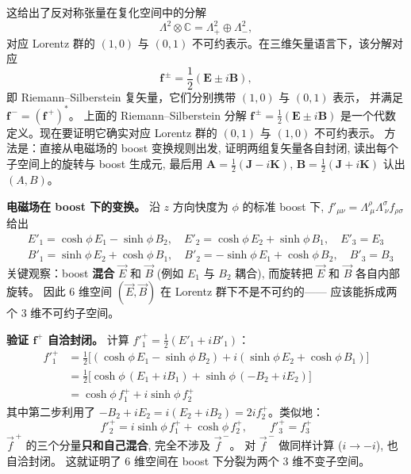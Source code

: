 这给出了反对称张量在复化空间中的分解
\[
\boxed{\Lambda^2 \otimes \mathbb{C} = \Lambda^2_+ \oplus \Lambda^2_-,}
\]
对应 Lorentz 群的 $(1,0)$ 与 $(0,1)$ 不可约表示。在三维矢量语言下，该分解对应
\begin{equation}
\boldsymbol{f}^{\,\pm} = \frac{1}{2}(\boldsymbol{E} \pm i\boldsymbol{B}),
\end{equation}
即 Riemann--Silberstein 复矢量，它们分别携带 $(1,0)$ 与 $(0,1)$ 表示，
并满足 $\boldsymbol{f}^{\,-} = (\boldsymbol{f}^{\,+})^*$。
上面的 Riemann--Silberstein 分解 $\boldsymbol{f}^{\,\pm}=\frac{1}{2}(\boldsymbol{E}\pm i\boldsymbol{B})$
是一个代数定义。现在要证明它确实对应 Lorentz 群的 $(0,1)$ 与 $(1,0)$ 不可约表示。
方法是：直接从电磁场的 boost 变换规则出发, 证明两组复矢量各自封闭,
读出每个子空间上的旋转与 boost 生成元, 最后用
$\boldsymbol{A}=\frac{1}{2}(\boldsymbol{J}-i\boldsymbol{K})$,
$\boldsymbol{B}=\frac{1}{2}(\boldsymbol{J}+i\boldsymbol{K})$ 认出 $(A,B)$。

\textbf{电磁场在 boost 下的变换。}
沿 $z$ 方向快度为 $\phi$ 的标准 boost 下,
$f'_{\mu\nu}=\Lambda^\rho_{\ \mu}\Lambda^\sigma_{\ \nu}f_{\rho\sigma}$ 给出
\begin{subequations}\label{eq:boost-EB}
\begin{align}
    &E'_1 = \cosh\phi\,E_1 - \sinh\phi\,B_2, \quad 
     E'_2 = \cosh\phi\,E_2 + \sinh\phi\,B_1, \quad 
     E'_3 = E_3 \label{eq:boost-E}\\
    &B'_1 = \sinh\phi\,E_2 + \cosh\phi\,B_1, \quad  
     B'_2 = -\sinh\phi\,E_1 + \cosh\phi\,B_2, \quad  
     B'_3 = B_3 \label{eq:boost-B}
\end{align}
\end{subequations}
关键观察：boost \textbf{混合} $\vec{E}$ 和 $\vec{B}$
(例如 $E_1$ 与 $B_2$ 耦合), 而旋转把 $\vec{E}$ 和 $\vec{B}$ 各自内部旋转。
因此 6 维空间 $(\vec{E},\vec{B})$ 在 Lorentz 群下不是不可约的——
应该能拆成两个 3 维不可约子空间。

\textbf{验证 $\boldsymbol{f}^+$ 自洽封闭。}
计算 $f'^+_1 = \frac{1}{2}(E'_1 + iB'_1)$：
\begin{align}
    f'^+_1 &= \frac{1}{2}\bigl[(\cosh\phi\,E_1 - \sinh\phi\,B_2) 
    + i(\sinh\phi\,E_2 + \cosh\phi\,B_1)\bigr] \nonumber\\
    &= \frac{1}{2}\bigl[\cosh\phi\,(E_1+iB_1) + \sinh\phi\,(-B_2+iE_2)\bigr] \nonumber\\
    &= \cosh\phi\,f^+_1 + i\sinh\phi\,f^+_2
\end{align}
其中第二步利用了 $-B_2+iE_2 = i(E_2+iB_2) = 2if^+_2$。类似地：
\begin{equation}
    f'^+_2 = i\sinh\phi\,f^+_1 + \cosh\phi\,f^+_2, \qquad f'^+_3 = f^+_3
\end{equation}
$\vec{f}^{\,+}$ 的三个分量\textbf{只和自己混合}, 完全不涉及 $\vec{f}^{\,-}$。
对 $\vec{f}^{\,-}$ 做同样计算 ($i\to -i$), 也自洽封闭。
这就证明了 6 维空间在 boost 下分裂为两个 3 维不变子空间。

